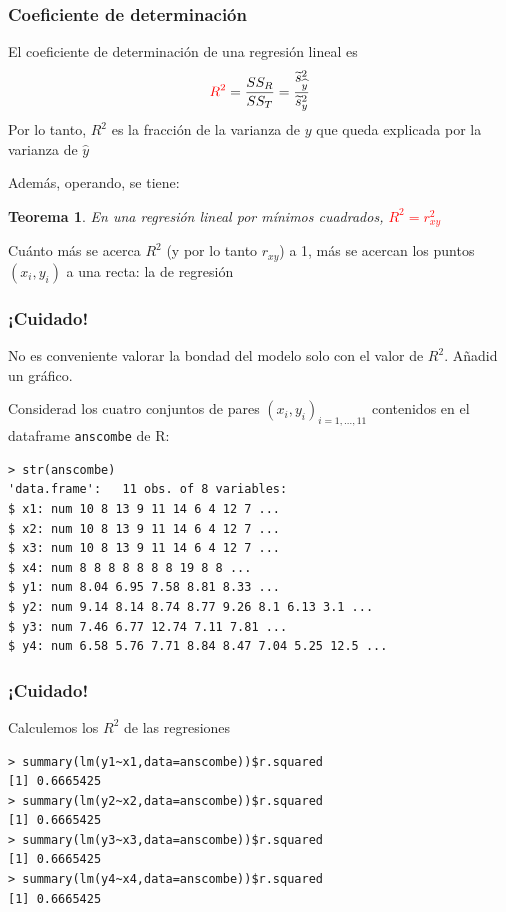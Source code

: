 \documentclass[12pt,t]{beamer}
\newcommand{\red}[1]{\textcolor{red}{#1}}
\renewcommand{\emph}[1]{{\color{red}#1}}
\theoremstyle{plain}
\newtheorem{teorema}{Teorema}
\theoremstyle{definition}
\begin{document}
\begin{frame}
\frametitle{Coeficiente de determinación}
El \emph{coeficiente de determinación} de una regresión lineal es
$$
\red{R^2}=\frac{SS_R}{SS_T}=\frac{\widetilde{s}_{\widehat{y}}^2}{\widetilde{s}_y^2}
$$
Por lo tanto, $R^2$ es la fracción de la varianza de $y$ que queda explicada por la varianza de $\widehat{y}$\medskip

Además, operando, se tiene:
\begin{teorema}
En una regresión lineal por mínimos cuadrados, \red{$R^2=r_{xy}^2$}
\end{teorema}\medskip

Cuánto más se acerca $R^2$ (y por lo tanto $r_{xy}$) a 1, más se acercan los puntos $(x_i,y_i)$ a una recta: la de regresión
\end{frame}

\begin{frame}[fragile]
\frametitle{¡Cuidado!}
No es conveniente valorar la bondad del modelo solo con el valor de $R^2$. Añadid un gráfico.\medskip

Considerad los cuatro conjuntos de pares $(x_i,y_i)_{i=1,\ldots,11}$ contenidos en el  dataframe \texttt{anscombe} de R:
\begin{lstlisting}
> str(anscombe)
'data.frame':	11 obs. of 8 variables:
$ x1: num 10 8 13 9 11 14 6 4 12 7 ...
$ x2: num 10 8 13 9 11 14 6 4 12 7 ...
$ x3: num 10 8 13 9 11 14 6 4 12 7 ...
$ x4: num 8 8 8 8 8 8 8 19 8 8 ...
$ y1: num 8.04 6.95 7.58 8.81 8.33 ...
$ y2: num 9.14 8.14 8.74 8.77 9.26 8.1 6.13 3.1 ...
$ y3: num 7.46 6.77 12.74 7.11 7.81 ...
$ y4: num 6.58 5.76 7.71 8.84 8.47 7.04 5.25 12.5 ...
\end{lstlisting}

\end{frame}

\begin{frame}[fragile]
\frametitle{¡Cuidado!}
Calculemos los $R^2$ de las regresiones\medskip

\begin{lstlisting}
> summary(lm(y1~x1,data=anscombe))$r.squared
[1] 0.6665425
> summary(lm(y2~x2,data=anscombe))$r.squared
[1] 0.6665425
> summary(lm(y3~x3,data=anscombe))$r.squared
[1] 0.6665425
> summary(lm(y4~x4,data=anscombe))$r.squared
[1] 0.6665425
\end{lstlisting}\medskip

\end{frame}
\end{document}
